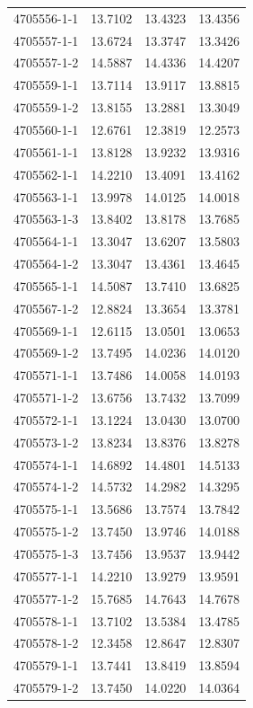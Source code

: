 \begin{longtable}{lrrr}
4705556-1-1 & 13.7102 & 13.4323 & 13.4356 \\
4705557-1-1 & 13.6724 & 13.3747 & 13.3426 \\
4705557-1-2 & 14.5887 & 14.4336 & 14.4207 \\
4705559-1-1 & 13.7114 & 13.9117 & 13.8815 \\
4705559-1-2 & 13.8155 & 13.2881 & 13.3049 \\
4705560-1-1 & 12.6761 & 12.3819 & 12.2573 \\
4705561-1-1 & 13.8128 & 13.9232 & 13.9316 \\
4705562-1-1 & 14.2210 & 13.4091 & 13.4162 \\
4705563-1-1 & 13.9978 & 14.0125 & 14.0018 \\
4705563-1-3 & 13.8402 & 13.8178 & 13.7685 \\
4705564-1-1 & 13.3047 & 13.6207 & 13.5803 \\
4705564-1-2 & 13.3047 & 13.4361 & 13.4645 \\
4705565-1-1 & 14.5087 & 13.7410 & 13.6825 \\
4705567-1-2 & 12.8824 & 13.3654 & 13.3781 \\
4705569-1-1 & 12.6115 & 13.0501 & 13.0653 \\
4705569-1-2 & 13.7495 & 14.0236 & 14.0120 \\
4705571-1-1 & 13.7486 & 14.0058 & 14.0193 \\
4705571-1-2 & 13.6756 & 13.7432 & 13.7099 \\
4705572-1-1 & 13.1224 & 13.0430 & 13.0700 \\
4705573-1-2 & 13.8234 & 13.8376 & 13.8278 \\
4705574-1-1 & 14.6892 & 14.4801 & 14.5133 \\
4705574-1-2 & 14.5732 & 14.2982 & 14.3295 \\
4705575-1-1 & 13.5686 & 13.7574 & 13.7842 \\
4705575-1-2 & 13.7450 & 13.9746 & 14.0188 \\
4705575-1-3 & 13.7456 & 13.9537 & 13.9442 \\
4705577-1-1 & 14.2210 & 13.9279 & 13.9591 \\
4705577-1-2 & 15.7685 & 14.7643 & 14.7678 \\
4705578-1-1 & 13.7102 & 13.5384 & 13.4785 \\
4705578-1-2 & 12.3458 & 12.8647 & 12.8307 \\
4705579-1-1 & 13.7441 & 13.8419 & 13.8594 \\
4705579-1-2 & 13.7450 & 14.0220 & 14.0364 \\

\end{longtable}
